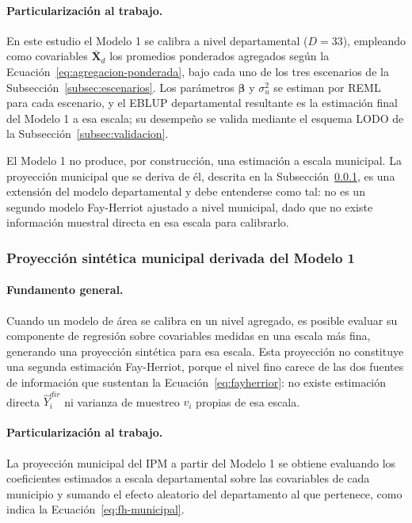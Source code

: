 \paragraph{Particularización al trabajo.}
En este estudio el Modelo 1 se calibra a nivel departamental ($D=33$), empleando como covariables $\bar{\mathbf{X}}_d$ los promedios ponderados agregados según la Ecuación~\ref{eq:agregacion-ponderada}, bajo cada uno de los tres escenarios de la Subsección~\ref{subsec:escenarios}. Los parámetros $\boldsymbol{\beta}$ y $\sigma^2_u$ se estiman por REML para cada escenario, y el EBLUP departamental resultante es la estimación final del Modelo 1 a esa escala; su desempeño se valida mediante el esquema LODO de la Subsección~\ref{subsec:validacion}.

El Modelo 1 no produce, por construcción, una estimación a escala municipal. La proyección municipal que se deriva de él, descrita en la Subsección~\ref{subsec:proyeccion-m1}, es una extensión del modelo departamental y debe entenderse como tal: no es un segundo modelo Fay-Herriot ajustado a nivel municipal, dado que no existe información muestral directa en esa escala para calibrarlo.

\subsubsection{Proyección sintética municipal derivada del Modelo 1}
\label{subsec:proyeccion-m1}

\paragraph{Fundamento general.}
Cuando un modelo de área se calibra en un nivel agregado, es posible evaluar su componente de regresión sobre covariables medidas en una escala más fina, generando una proyección sintética para esa escala. Esta proyección no constituye una segunda estimación Fay-Herriot, porque el nivel fino carece de las dos fuentes de información que sustentan la Ecuación~\ref{eq:fayherrior}: no existe estimación directa $\hat{Y}_i^{dir}$ ni varianza de muestreo $v_i$ propias de esa escala.

\paragraph{Particularización al trabajo.}
La proyección municipal del IPM a partir del Modelo 1 se obtiene evaluando los coeficientes estimados a escala departamental sobre las covariables de cada municipio y sumando el efecto aleatorio del departamento al que pertenece, como indica la Ecuación~\ref{eq:fh-municipal}.

